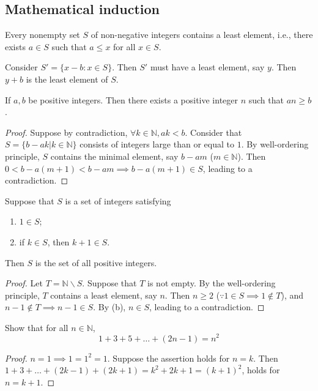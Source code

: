\documentclass{article}
\begin{document}
\begin{multicols}{2}
\tableofcontents

\section{Mathematical induction}
\begin{mytheorem}
Every nonempty set $S$ of non-negative integers contains a least element, i.e., there exists $a\in S$ such that $a\leq x$ for all $x\in S$.

Consider $S'=\{x-b:x\in S\}$. Then $S'$ must have a least element, say $y$. Then $y+b$ is the least element of $S$.
\end{mytheorem}

\begin{mytheorem}
If $a,b$ be positive integers. Then there exists a positive integer $n$ such that $an\geq b$.
\end{mytheorem}
\begin{proof}
Suppose by contradiction, $\forall k\in \mathbb{N}, ak<b$. Consider that $S=\{b-ak|k\in \mathbb{N}\}$ consists of integers large than or equal to $1$. By well-ordering principle, $S$ contains the minimal element, say $b-am$ ($m\in \mathbb{N}$). Then $0<b-a(m+1)<b-am \implies b-a(m+1)\in S$, leading to a contradiction.
\end{proof}

\begin{mytheorem}
Suppose that $S$ is a set of integers satisfying
\begin{enumerate}[label={(\alph*)}]
\item $1\in S$;
\item if $k\in S$, then $k+1\in S$.
\end{enumerate}
Then $S$ is the set of all positive integers.
\end{mytheorem}
\begin{proof}
Let $T=\mathbb{N}\backslash S$. Suppose that $T$ is not empty. By the well-ordering principle, $T$ contains a least element, say $n$. Then $n\geq 2$ ($\because 1\in S \implies 1\notin T$), and $n-1\notin T \implies n-1\in S$. By (b), $n\in S$, leading to a contradiction.
\end{proof}


\begin{example}
Show that for all $n\in \mathbb{N}$,
$$1+3+5+\dots +(2n-1)=n^2$$
\end{example}
\begin{proof}
$n=1 \implies 1=1^2=1$.
Suppose the assertion holds for $n=k$.
Then $1+3+\dots+(2k-1)+(2k+1)=k^2+2k+1=(k+1)^2$, holds for $n=k+1$.
\end{proof}


\end{multicols}
\end{document}
